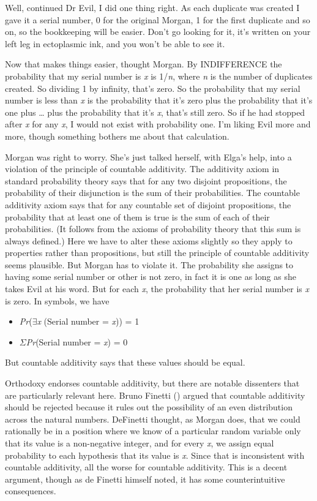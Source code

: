 \documentclass[
  11pt,
  letterpaper,
  DIV=11,
  numbers=noendperiod,
  oneside]{scrartcl}
\providecommand{\tightlist}{%
  \setlength{\itemsep}{0pt}\setlength{\parskip}{0pt}}\usepackage{longtable,booktabs,array}
\begin{document}
Well, continued Dr Evil, I did one thing right. As each duplicate was
created I gave it a serial number, 0 for the original Morgan, 1 for the
first duplicate and so on, so the bookkeeping will be easier. Don't go
looking for it, it's written on your left leg in ectoplasmic ink, and
you won't be able to see it.

Now that makes things easier, thought Morgan. By INDIFFERENCE the
probability that my serial number is \emph{x} is 1/\emph{n}, where
\emph{n} is the number of duplicates created. So dividing 1 by infinity,
that's zero. So the probability that my serial number is less than
\emph{x} is the probability that it's zero plus the probability that
it's one plus \ldots{} plus the probability that it's \emph{x}, that's
still zero. So if he had stopped after \emph{x} for any \emph{x}, I
would not exist with probability one. I'm liking Evil more and more,
though something bothers me about that calculation.

Morgan was right to worry. She's just talked herself, with Elga's help,
into a violation of the principle of countable additivity. The
additivity axiom in standard probability theory says that for any two
disjoint propositions, the probability of their disjunction is the sum
of their probabilities. The countable additivity axiom says that for any
countable set of disjoint propositions, the probability that at least
one of them is true is the sum of each of their probabilities. (It
follows from the axioms of probability theory that this sum is always
defined.) Here we have to alter these axioms slightly so they apply to
properties rather than propositions, but still the principle of
countable additivity seems plausible. But Morgan has to violate it. The
probability she assigns to having some serial number or other is not
zero, in fact it is one as long as she takes Evil at his word. But for
each \emph{x}, the probability that her serial number is \emph{x} is
zero. In symbols, we have

\begin{itemize}
\tightlist
\item
  \emph{Pr}(\({\exists}\)\emph{x} (Serial number = \emph{x})) = 1
\item
  \({\Sigma}\)\emph{Pr}(Serial number = \emph{x}) = 0
\end{itemize}

But countable additivity says that these values should be equal.

Orthodoxy endorses countable additivity, but there are notable
dissenters that are particularly relevant here. Bruno Finetti
() argued that countable additivity
should be rejected because it rules out the possibility of an even
distribution across the natural numbers. DeFinetti thought, as Morgan
does, that we could rationally be in a position where we know of a
particular random variable only that its value is a non-negative
integer, and for every \emph{x}, we assign equal probability to each
hypothesis that its value is \emph{x}. Since that is inconsistent with
countable additivity, all the worse for countable additivity. This is a
decent argument, though as de Finetti himself noted, it has some
counterintuitive consequences.
\end{document}
